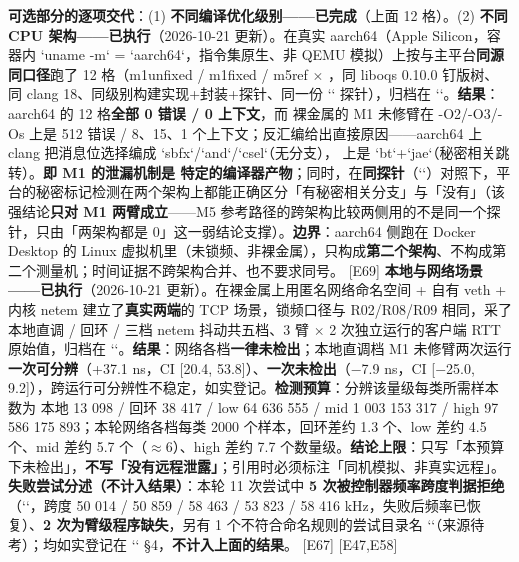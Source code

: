\documentclass[UTF8,fontset=fandol,11pt,a4paper]{ctexart}
\begin{document}
\textbf{可选部分的逐项交代}：(1) \textbf{不同编译优化级别——已完成}（上面 12 格）。(2) \textbf{不同 CPU 架构——已执行}（2026-10-21 更新）。在真实 aarch64（Apple Silicon，容器内 `uname -m` = `aarch64`，指令集原生、非 QEMU 模拟）上按与主平台\textbf{同源同口径}跑了 12 格（m1unfixed / m1fixed / m5ref \texorpdfstring{$\times$}{x} \texttt{}，同 liboqs 0.10.0 钉版树、同 clang 18、同级别构建实现+封装+探针、同一份 `\texttt{}` 探针），归档在 `\texttt{}`。\textbf{结果}：aarch64 的 12 格\textbf{全部 0 错误 / 0 上下文}，而 \texttt{} 裸金属的 M1 未修臂在 -O2/-O3/-Os 上是 512 错误 / 8、15、1 个上下文；反汇编给出直接原因——aarch64 上 clang 把消息位选择编成 `sbfx`/`and`/`csel`（无分支），\texttt{} 上是 `bt`+`jae`（秘密相关跳转）。\textbf{即 M1 的泄漏机制是 \texttt{} 特定的编译器产物}；同时，在\textbf{同探针}（`\texttt{}`）对照下，平台的秘密标记检测在两个架构上都能正确区分「有秘密相关分支」与「没有」（该强结论\textbf{只对 M1 两臂成立}——M5 参考路径的跨架构比较两侧用的不是同一个探针，只由「两架构都是 0」这一弱结论支撑）。\textbf{边界}：aarch64 侧跑在 Docker Desktop 的 Linux 虚拟机里（未锁频、非裸金属），只构成\textbf{第二个架构}、不构成第二个测量机；时间证据不跨架构合并、也不要求同号。 [E69] \textbf{本地与网络场景——已执行}（2026-10-21 更新）。在裸金属上用匿名网络命名空间 + 自有 veth + 内核 netem 建立了\textbf{真实两端}的 TCP 场景，锁频口径与 R02/R08/R09 相同，采了本地直调 / 回环 / 三档 netem 抖动共五档、3 臂 \texorpdfstring{$\times$}{x} 2 次独立运行的客户端 RTT 原始值，归档在 `\texttt{}`。\textbf{结果}：网络各档\textbf{一律未检出}；本地直调档 M1 未修臂两次运行\textbf{一次可分辨}（+37.1 ns，CI [20.4, 53.8]）、\textbf{一次未检出}（\texorpdfstring{$-$}{-}7.9 ns，CI [\texorpdfstring{$-$}{-}25.0, 9.2]），跨运行可分辨性不稳定，如实登记。\textbf{检测预算}：分辨该量级每类所需样本数为 本地 13 098 / 回环 38 417 / low 64 636 555 / mid 1 003 153 317 / high 97 586 175 893；本轮网络各档每类 2000 个样本，回环差约 1.3 个、low 差约 4.5 个、mid 差约 5.7 个（\texorpdfstring{$\approx$}{~=}6）、high 差约 7.7 个数量级。\textbf{结论上限}：只写「本预算下未检出」，\textbf{不写「没有远程泄露」}；引用时必须标注「同机模拟、非真实远程」。\textbf{失败尝试分述（不计入结果）}：本轮 11 次尝试中 \textbf{5 次被控制器频率跨度判据拒绝}（`\texttt{}`，跨度 50 014 / 50 859 / 58 463 / 53 823 / 58 416 kHz，失败后频率已恢复）、\textbf{2 次为臂级程序缺失}，另有 1 个不符合命名规则的尝试目录名 `\texttt{}`（来源待考）；均如实登记在 `\texttt{}` §4，\textbf{不计入上面的结果}。 [E67] [E47,E58]
\end{document}
